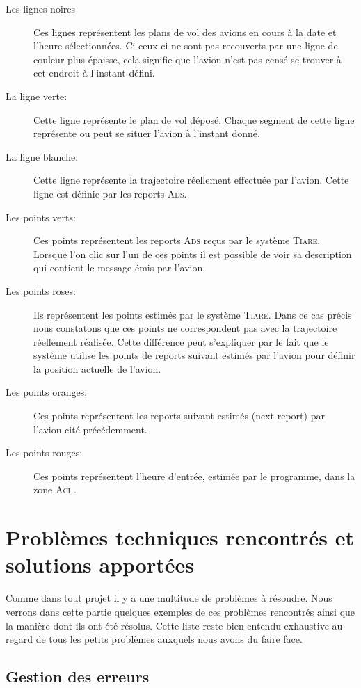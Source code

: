 \begin{description}
\item[Les lignes noires] Ces lignes représentent les plans de vol des avions en cours à la date et l'heure sélectionnées. Ci ceux-ci ne sont pas recouverts par une ligne de couleur plus épaisse, cela signifie que l'avion n'est pas censé se trouver à cet endroit à l'instant défini. 
\item[La ligne verte:] Cette ligne représente le plan de vol déposé. Chaque segment de cette ligne représente ou peut se situer l'avion à l'instant donné.
\item[La ligne blanche:] Cette ligne représente la trajectoire réellement effectuée par l'avion. Cette ligne est définie par les reports \textsc{Ads}.
\item[Les points verts:] Ces points représentent les reports \textsc{Ads} reçus par le système \textsc{Tiare}. Lorsque l'on clic sur l'un de ces points il est possible de voir sa description qui contient le message émis par l'avion.
\item[Les points roses:] Ils représentent les points estimés par le système \textsc{Tiare}. Dans ce cas précis nous constatons que ces points ne correspondent pas avec la trajectoire réellement réalisée. Cette différence peut s'expliquer par le fait que le système utilise les points de reports suivant estimés par l'avion pour définir la position actuelle de l'avion.
\item[Les points oranges:] Ces points représentent les reports suivant estimés (next report) par l'avion cité précédemment.
\item[Les points rouges:] Ces points représentent l'heure d'entrée, estimée par le programme, dans la zone \textsc{Aci} . 
\end{description}




\section{Problèmes techniques rencontrés et solutions apportées}
Comme dans tout projet il y a une multitude de problèmes à résoudre. Nous verrons dans cette partie quelques exemples de ces problèmes rencontrés ainsi que la manière dont ils ont été résolus. Cette liste reste bien entendu exhaustive au regard de tous les petits problèmes auxquels nous avons du faire face.

    \subsection{Gestion des erreurs}
